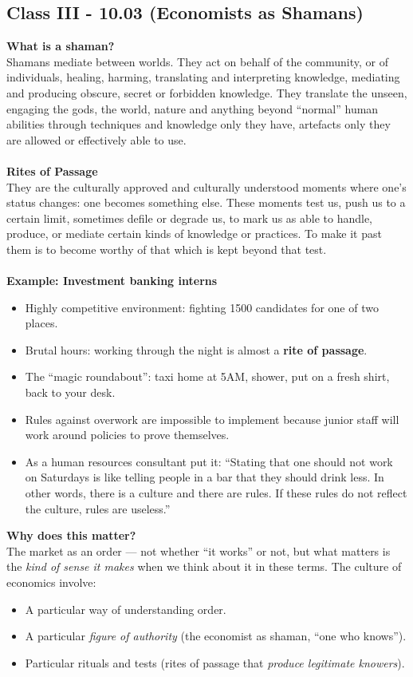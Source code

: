 \documentclass[a4paper,12pt]{article}
\begin{document}
\subsection*{Class III - 10.03 (Economists as Shamans)}
\noindent \textbf{What is a shaman?} \\
\noindent Shamans mediate between worlds. They act on behalf of the community, or of individuals, healing, harming, translating and interpreting knowledge, mediating and producing obscure, secret or forbidden knowledge. They translate the unseen, engaging the gods, the world, nature and anything beyond ``normal'' human abilities through techniques and knowledge only they have, artefacts only they are allowed or effectively able to use. \\
\\
\noindent \textbf{Rites of Passage} \\
\noindent They are the culturally approved and culturally understood moments where one's status changes: one becomes something else. These moments test us, push us to a certain limit, sometimes defile or degrade us, to mark us as able to handle, produce, or mediate certain kinds of knowledge or practices. To make it past them is to become worthy of that which is kept beyond that test. \\
\\
\noindent \textbf{Example: Investment banking interns}
\begin{itemize}
	\item Highly competitive environment: fighting 1500 candidates for one of two places.
	\item Brutal hours: working through the night is almost a \textbf{rite of passage}.
	\item The ``magic roundabout'': taxi home at 5AM, shower, put on a fresh shirt, back to your desk.
	\item Rules against overwork are impossible to implement because junior staff will work around policies to prove themselves.
	\item As a human resources consultant put it: ``Stating that one should not work on Saturdays is like telling people in a bar that they should drink less. In other words, there is a culture and there are rules. If these rules do not reflect the culture, rules are useless.''
\end{itemize}

\noindent \textbf{Why does this matter?} \\
\noindent The market as an order — not whether ``it works'' or not, but what matters is the \emph{kind of sense it makes} when we think about it in these terms. The culture of economics involve:
\begin{itemize}
	\item A particular way of understanding order.
	\item A particular \emph{figure of authority} (the economist as shaman, ``one who knows'').
	\item Particular rituals and tests (rites of passage that \emph{produce legitimate knowers}).
\end{itemize}
\end{document}
